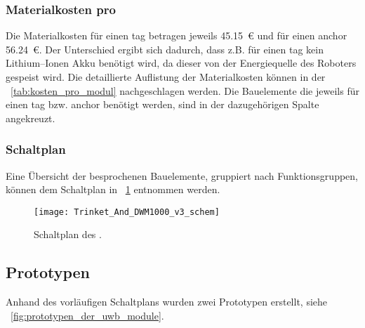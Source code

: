 \subsubsection{Materialkosten pro }

Die Materialkosten für einen \gls{tag} betragen jeweils \SI{45.15}{\euro} und für einen \gls{anchor} \SI{56.24}{\euro}. Der Unterschied ergibt sich dadurch, dass z.B. für einen \gls{tag} kein Lithium--Ionen Akku benötigt wird, da dieser von der Energiequelle des Roboters gespeist wird.
Die detaillierte Auflistung der Materialkosten können in der \tablename~\ref{tab:kosten_pro_modul} nachgeschlagen werden. Die Bauelemente die jeweils für einen \gls{tag} bzw. \gls{anchor} benötigt werden, sind in der dazugehörigen Spalte angekreuzt.


\begin{comment}
- Schaltplan-Skizze
	- Besonderheiten (NetLabels)
	- SVG/PNG/PDF-Export
	- Gruppierung nach Funktionsgruppen
------------------------------------------------------------------------------------------
\end{comment}
\subsubsection{Schaltplan} \label{subsec:schaltplan_uwb_modul}

Eine Übersicht der besprochenen Bauelemente, gruppiert nach Funktionsgruppen, können dem Schaltplan in \figurename~\ref{fig:schaltplan_uwb_modul} entnommen werden.

\begin{figure}
	\texttt{[image: Trinket\_And\_DWM1000\_v3\_schem]}
	\caption{Schaltplan des .}
	\label{fig:schaltplan_uwb_modul}
\end{figure}


\begin{comment}
------------------------------------------------------------------------------------------
- 1. Prototyp Aufbau auf einem Breadboard
	- UWB-Adapter von ...?
	- SMD Löttechnik
	- Funktionstest
	- Skript als Anhang
- 2. Prototyp Aufbau auf einem Lochstreifen
	- Kommunikations- und Entfernungsmessungstest
\end{comment}
\subsection{Prototypen}

Anhand des vorläufigen Schaltplans wurden zwei Prototypen erstellt, siehe \figurename~\ref{fig:prototypen_der_uwb_module}.

